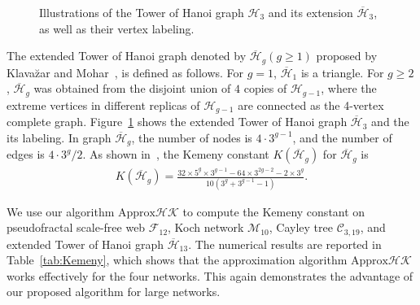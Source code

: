 \documentclass[10pt,twocolumn,twoside]{IEEEtran}
\begin{document}
\begin{figure}[!t]
{\begin{minipage}[t]{0.5\linewidth}
            \label{exSierpinski}
        \end{minipage}%
    }%
    \centering
    \caption{Illustrations of the Tower of Hanoi graph \(\mathcal{H}_{3}\) and its extension \(\overline{\mathcal{H}}_{3}\), as well as  their vertex labeling.}
\end{figure}

The extended  Tower of Hanoi graph denoted by \(\overline{\mathcal{H}}_{g}(g\ge 1)\)  proposed by Klava\u zar and Mohar~\cite{KlMo05}, is defined as follows. For \(g=1\), \(\overline{\mathcal{H}}_{1}\) is a triangle. For \(g\ge2\),  \(\overline{\mathcal{H}}_{g}\) was obtained from the disjoint union of \(4\) copies of \(\mathcal{H}_{g-1}\), where the extreme vertices in different  replicas of \(\mathcal{H}_{g-1}\) are connected as the 4-vertex complete graph. Figure~\ref{exSierpinski} shows the extended  Tower of Hanoi graph \(\overline{\mathcal{H}}_{3}\) and the its labeling. In graph \(\overline{\mathcal{H}}_{g}\), the number of nodes is \(4\cdot3^{g-1}\), and the number of edges is \(4\cdot3^g/2\). As shown in~\cite{QiZh18}, the Kemeny constant \(K(\overline{\mathcal{H}}_{g})\) for \(\overline{\mathcal{H}}_{g}\) is
\begin{align}
    K(\overline{\mathcal{H}}_{g}) = \frac{32\times5^g\times3^{g-1}-64\times3^{2g-2}-2\times3^g}{10(3^g+3^{g-1}-1)}.
    \label{Kg04}
\end{align}

We use our algorithm \(\text{Approx}\mathcal{HK}\) to compute the Kemeny constant on   pseudofractal scale-free web \(\mathcal{F}_{12}\),  Koch network \(\mathcal{M}_{10}\),   Cayley tree \(\mathcal{C}_{3,19}\), and   extended  Tower of Hanoi graph \(\overline{\mathcal{H}}_{13}\). The numerical results are reported in  Table~\ref{tab:Kemeny}, which shows that the approximation algorithm \(\text{Approx}\mathcal{HK}\) works effectively for the four  networks. This again demonstrates the advantage of our proposed algorithm for large networks.
\end{document}
